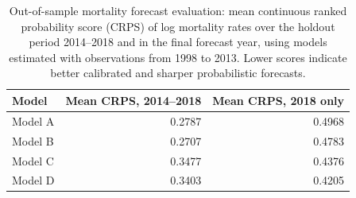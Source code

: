 \begin{table}[ht]
\centering
\caption{Out-of-sample mortality forecast evaluation: mean continuous ranked probability score (CRPS) of log mortality rates over the holdout period 2014--2018 and in the final forecast year, using models estimated with observations from 1998 to 2013. Lower scores indicate better calibrated and sharper probabilistic forecasts.}
\label{tab:outofsample_mortality_crps}
\begin{tabular}{lrr}
\hline
Model & Mean CRPS, 2014--2018 & Mean CRPS, 2018 only \\
\hline
Model A & 0.2787 & 0.4968 \\
Model B & 0.2707 & 0.4783 \\
Model C & 0.3477 & 0.4376 \\
Model D & 0.3403 & 0.4205 \\
\hline
\end{tabular}
\end{table}
